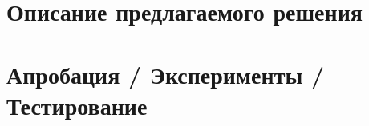 \documentclass[a4paper]{article}
\begin{document}



\section{Описание предлагаемого решения}


\section{Апробация / Эксперименты / Тестирование}



\end{document}
